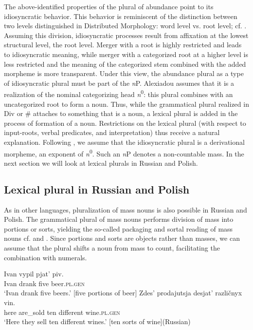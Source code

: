 \documentclass[output=paper,colorlinks,citecolor=brown]{langscibook}
\begin{document}
\noindent The above-identified properties of the plural of abundance point to its idiosyncratic behavior. This behavior is reminiscent of the distinction between two levels distinguished in Distributed Morphology: word level vs. root level; cf. \citet{Marantz2001}. Assuming this division, idiosyncratic processes result from affixation at the lowest structural level,  the root level. Merger with a root is highly restricted and leads to idiosyncratic meaning, while merger with a categorized root at a higher level is less restricted and the meaning of the categorized stem combined with the added morpheme is more transparent. Under this view, the abundance plural as a type of idiosyncratic plural must be part of the \textit{n}P. Alexiadou assumes that it is a realization of the nominal categorizing head \textit{n}\textsuperscript{0}: this plural combines with an uncategorized root to form a noun. Thus, while the grammatical plural realized in Div or \# attaches to something that is a noun, a lexical plural is added in the process of formation of a noun. Restrictions on the lexical plural (with respect to input-roots, verbal predicates, and interpretation) thus receive a natural explanation. Following \citet{Alexiadou2011}, we assume that the idiosyncratic plural is a derivational morpheme, an exponent of \textit{n}\textsuperscript{0}. Such an \textit{n}P denotes a non-countable mass. In the next section we will look at lexical plurals in Russian and Polish. 


\subsection{Lexical plural in Russian and Polish}\label{sec:geist:4.3}

As in other languages, pluralization of mass nouns is also possible in Russian and Polish. The grammatical plural of mass nouns performs division of mass into portions or sorts, yielding the so-called packaging and sortal reading of mass nouns cf.  and . Since portions and sorts are objects rather than masses, we can assume that the plural shifts a noun from mass to count, facilitating the combination with numerals.

\ea\label{ex:geist:38}
\ea\gll Ivan vypil pjat' piv.  \\	
Ivan drank five beer.\textsc{pl.gen} \\ 
\glt `Ivan drank five beers.' [five portions of beer]\label{ex:geist:38a}
\ex\gll Zdes' prodajutsja desjat' različnyx vin. \\
here are\_sold ten different wine.\textsc{pl.gen} \\
\glt `Here they sell ten different wines.' [ten sorts of wine]\hfill (Russian)\label{ex:geist:38b}
\z\z
\end{document}
